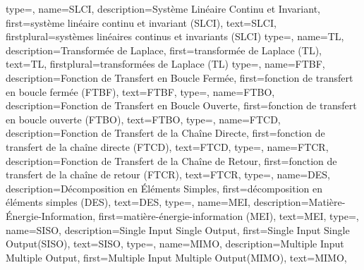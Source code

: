 {%
  type=\acronymtype,%
  name={SLCI},%
  description={Système Linéaire Continu et Invariant},%
  first={système linéaire continu et invariant (SLCI)},%
  text={{\scshape SLCI}},%
  firstplural={systèmes\- linéaires\- continus\- et\- invariants\- (SLCI)}%
}
{%
  type=\acronymtype,%
  name={TL},%
  description={Transformée de Laplace},%
  first={transformée de Laplace (TL)},%
  text={{\scshape TL}},%
  firstplural={transformées de Laplace (TL)}%
}
{%
  type=\acronymtype,%
  name={FTBF},%
  description={Fonction de Transfert en Boucle Fermée},%
  first={fonction de transfert en boucle fermée (FTBF)},%
  text={{\scshape FTBF}},%
}
{%
  type=\acronymtype,%
  name={FTBO},%
  description={Fonction de Transfert en Boucle Ouverte},%
  first={fonction de transfert en boucle ouverte (FTBO)},%
  text={{\scshape FTBO}},%
}
{%
  type=\acronymtype,%
  name={FTCD},%
  description={Fonction de Transfert de la Chaîne Directe},%
  first={fonction de transfert de la chaîne directe (FTCD)},%
  text={{\scshape FTCD}},%
}
{%
  type=\acronymtype,%
  name={FTCR},%
  description={Fonction de Transfert de la Chaîne de Retour},%
  first={fonction de transfert de la chaîne de retour (FTCR)},%
  text={{\scshape FTCR}},%
}
{%
  type=\acronymtype,%
  name={DES},%
  description={Décomposition en \'Eléments Simples},%
  first={dé\-compo\-sition\- en\- éléments\- simples\- (DES)},%
  text={{\scshape DES}},%
}
{%
  type=\acronymtype,%
  name={MEI},%
  description={Matière-\'Energie-Information},%
  first={matière-énergie-information (MEI)},%
  text={{\scshape MEI}},%
}
{%
  type=\acronymtype,%
  name={SISO},%
  description={Single Input Single Output},%
  first={\og Single Input Single Output\fg (SISO)},%
  text={{\scshape SISO}},%
}
{%
  type=\acronymtype,%
  name={MIMO},%
  description={Multiple Input Multiple Output},%
  first={\og Multiple Input Multiple Output\fg (MIMO)},%
  text={{\scshape MIMO}},%
}
